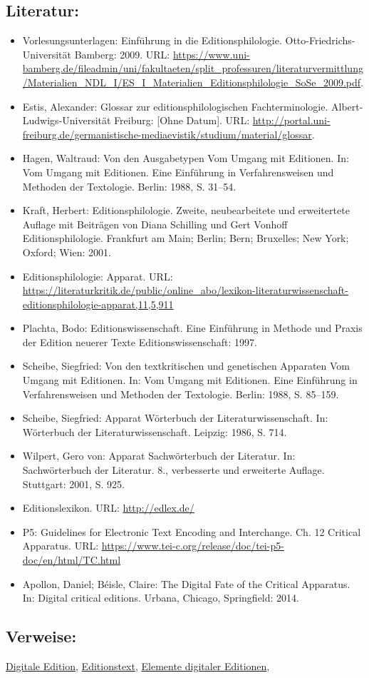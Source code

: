 \documentclass{article}
\begin{document}
        \subsection*{Literatur:}\begin{itemize}\item Vorlesungsunterlagen: Einführung in die Editionsphilologie. Otto-Friedrichs-Universität Bamberg: 2009. URL: \url{https://www.uni-bamberg.de/fileadmin/uni/fakultaeten/split_professuren/literaturvermittlung/Materialien_NDL_I/ES_I_Materialien_Editionsphilologie_SoSe_2009.pdf}.\item Estis, Alexander: Glossar zur editionsphilologischen Fachterminologie. Albert-Ludwigs-Universität Freiburg: [Ohne Datum]. URL: \url{http://portal.uni-freiburg.de/germanistische-mediaevistik/studium/material/glossar}.\item Hagen, Waltraud: Von den Ausgabetypen Vom Umgang mit Editionen. In: Vom Umgang mit Editionen. Eine Einführung in Verfahrensweisen und Methoden der Textologie. Berlin: 1988, S. 31–54.\item Kraft, Herbert: Editionsphilologie. Zweite, neubearbeitete und erweitertete Auflage mit Beiträgen von Diana Schilling und Gert Vonhoff Editionsphilologie. Frankfurt am Main; Berlin; Bern; Bruxelles; New York; Oxford; Wien: 2001.\item Editionsphilologie: Apparat. URL: \url{https://literaturkritik.de/public/online_abo/lexikon-literaturwissenschaft-editionsphilologie-apparat,11,5,911}\item Plachta, Bodo: Editionswissenschaft. Eine Einführung in Methode und Praxis der Edition neuerer Texte Editionswissenschaft: 1997.\item Scheibe, Siegfried: Von den textkritischen und genetischen Apparaten Vom Umgang mit Editionen. In: Vom Umgang mit Editionen. Eine Einführung in Verfahrensweisen und Methoden der Textologie. Berlin: 1988, S. 85–159.\item Scheibe, Siegfried: Apparat Wörterbuch der Literaturwissenschaft. In: Wörterbuch der Literaturwissenschaft. Leipzig: 1986, S. 714.\item Wilpert, Gero von: Apparat Sachwörterbuch der Literatur. In: Sachwörterbuch der Literatur. 8., verbesserte und erweiterte Auflage. Stuttgart: 2001, S. 925.\item Editionslexikon. URL: \url{http://edlex.de/}\item P5: Guidelines for Electronic Text Encoding and Interchange. Ch. 12 Critical Apparatus. URL: \url{https://www.tei-c.org/release/doc/tei-p5-doc/en/html/TC.html}\item Apollon, Daniel; Béisle, Claire: The Digital Fate of the Critical Apparatus. In: Digital critical editions. Urbana, Chicago, Springfield: 2014.\end{itemize}\subsection*{Verweise:}\href{https://gams.uni-graz.at/o:konde.59}{Digitale Edition}, \href{https://gams.uni-graz.at/o:konde.75}{Editionstext}, \href{https://gams.uni-graz.at/o:konde.80}{Elemente digitaler Editionen}, 
\end{document}
